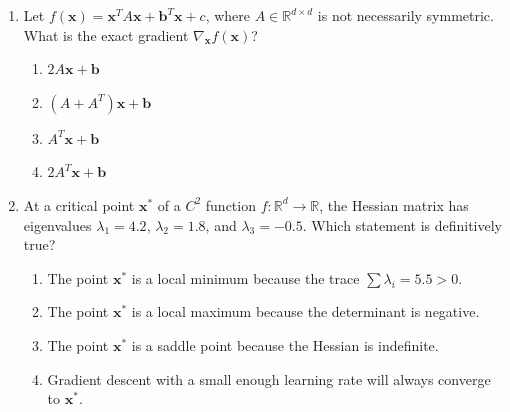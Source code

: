 \begin{enumerate}[label=\textbf{MCQ\arabic*.}]
    \item Let $f(\mathbf{x}) = \mathbf{x}^T A \mathbf{x} + \mathbf{b}^T \mathbf{x} + c$, where $A \in \mathbb{R}^{d \times d}$ is not necessarily symmetric. What is the exact gradient $\nabla_{\mathbf{x}} f(\mathbf{x})$?
    \begin{enumerate}[label=(\alph*)]
        \item $2A\mathbf{x} + \mathbf{b}$
        \item $(A + A^T)\mathbf{x} + \mathbf{b}$
        \item $A^T \mathbf{x} + \mathbf{b}$
        \item $2A^T \mathbf{x} + \mathbf{b}$
    \end{enumerate}

    \item At a critical point $\mathbf{x}^*$ of a $C^2$ function $f: \mathbb{R}^d \to \mathbb{R}$, the Hessian matrix has eigenvalues $\lambda_1 = 4.2$, $\lambda_2 = 1.8$, and $\lambda_3 = -0.5$. Which statement is definitively true?
    \begin{enumerate}[label=(\alph*)]
        \item The point $\mathbf{x}^*$ is a local minimum because the trace $\sum \lambda_i = 5.5 > 0$.
        \item The point $\mathbf{x}^*$ is a local maximum because the determinant is negative.
        \item The point $\mathbf{x}^*$ is a saddle point because the Hessian is indefinite.
        \item Gradient descent with a small enough learning rate will always converge to $\mathbf{x}^*$.
    \end{enumerate}
\end{enumerate}
